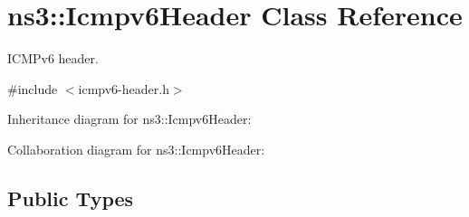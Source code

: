 \hypertarget{classns3_1_1Icmpv6Header}{}\section{ns3\+:\+:Icmpv6\+Header Class Reference}
\label{classns3_1_1Icmpv6Header}


I\+C\+M\+Pv6 header.  




{\ttfamily \#include $<$icmpv6-\/header.\+h$>$}



Inheritance diagram for ns3\+:\+:Icmpv6\+Header\+:


Collaboration diagram for ns3\+:\+:Icmpv6\+Header\+:
\subsection*{Public Types}
